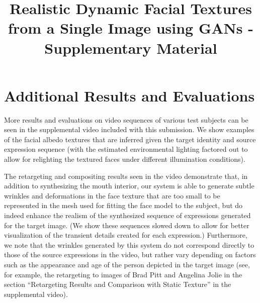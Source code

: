 \documentclass[10pt,twocolumn,letterpaper]{article}
\begin{document}
\title{Realistic Dynamic Facial Textures from a Single Image using GANs - Supplementary Material}


\maketitle

\section{Additional Results and Evaluations}


More results and evaluations on video sequences of various test subjects can be seen in the supplemental video included with this submission. We show examples of the facial albedo textures that are inferred given the target identity and source expression sequence (with the estimated environmental lighting factored out to allow for relighting the textured faces under different illumination conditions).

The retargeting and compositing results seen in the video demonstrate that, in addition to synthesizing the mouth interior, our system is able to generate subtle wrinkles and deformations in the face texture that are too small to be represented in the mesh used for fitting the face model to the subject, but do indeed enhance the realism of the synthesized sequence of expressions generated for the target image. (We show these sequences slowed down to allow for better visualization of the transient details created for each expression.) Furthermore, we note that the wrinkles generated by this system do not correspond directly to those of the source expressions in the video, but rather vary depending on factors such as the appearance and age of the person depicted in the target image (see, for example, the retargeting to images of Brad Pitt and Angelina Jolie in the section ``Retargeting Results and Comparison with Static Texture'' in the supplemental video).
\end{document}

